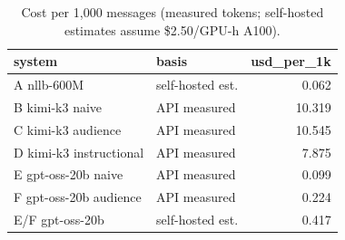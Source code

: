 \begin{table}[t]
\centering
\small
\begin{tabular}{llr}
\toprule
system & basis & usd_per_1k \\
\midrule
A nllb-600M & self-hosted est. & 0.062 \\
B kimi-k3 naive & API measured & 10.319 \\
C kimi-k3 audience & API measured & 10.545 \\
D kimi-k3 instructional & API measured & 7.875 \\
E gpt-oss-20b naive & API measured & 0.099 \\
F gpt-oss-20b audience & API measured & 0.224 \\
E/F gpt-oss-20b & self-hosted est. & 0.417 \\
\bottomrule
\end{tabular}
\caption{Cost per 1{,}000 messages (measured tokens; self-hosted estimates assume \$2.50/GPU-h A100).}
\label{tab:costs}
\end{table}
